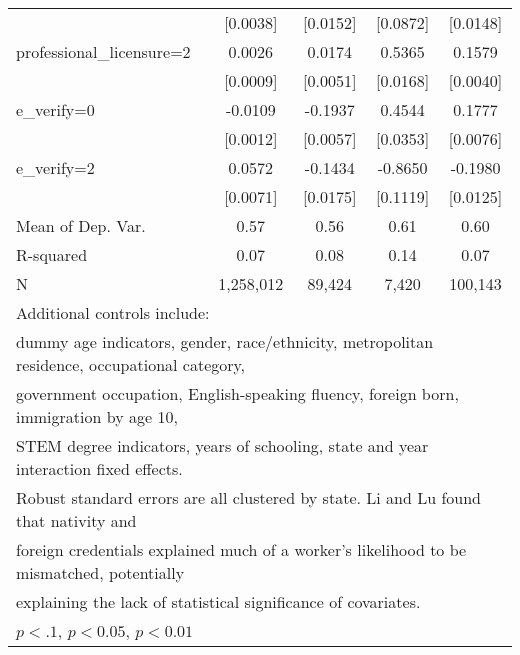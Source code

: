 \begin{table}[htbp]
\begin{tabular}{l*{4}{c}}
                    &    [0.0038]         &    [0.0152]         &    [0.0872]         &    [0.0148]         \\
\addlinespace
professional\_licensure=2&      0.0026\sym{***}&      0.0174\sym{***}&      0.5365\sym{***}&      0.1579\sym{***}\\
                    &    [0.0009]         &    [0.0051]         &    [0.0168]         &    [0.0040]         \\
\addlinespace
e\_verify=0          &     -0.0109\sym{***}&     -0.1937\sym{***}&      0.4544\sym{***}&      0.1777\sym{***}\\
                    &    [0.0012]         &    [0.0057]         &    [0.0353]         &    [0.0076]         \\
\addlinespace
e\_verify=2          &      0.0572\sym{***}&     -0.1434\sym{***}&     -0.8650\sym{***}&     -0.1980\sym{***}\\
                    &    [0.0071]         &    [0.0175]         &    [0.1119]         &    [0.0125]         \\
\midrule
Mean of Dep. Var.   &        0.57         &        0.56         &        0.61         &        0.60         \\
R-squared           &        0.07         &        0.08         &        0.14         &        0.07         \\
N                   &   1,258,012         &      89,424         &       7,420         &     100,143         \\
\bottomrule
\multicolumn{5}{l}{\footnotesize Additional controls include:}\\
\multicolumn{5}{l}{\footnotesize dummy age indicators, gender, race/ethnicity, metropolitan residence, occupational category,}\\
\multicolumn{5}{l}{\footnotesize government occupation, English-speaking fluency, foreign born, immigration by age 10,}\\
\multicolumn{5}{l}{\footnotesize STEM degree indicators, years of schooling, state and year interaction fixed effects.}\\
\multicolumn{5}{l}{\footnotesize Robust standard errors are all clustered by state. Li and Lu found that nativity and}\\
\multicolumn{5}{l}{\footnotesize foreign credentials explained much of a worker's likelihood to be mismatched, potentially}\\
\multicolumn{5}{l}{\footnotesize explaining the lack of statistical significance of covariates.}\\
\multicolumn{5}{l}{\footnotesize \sym{*} \(p<.1\), \sym{**} \(p<0.05\), \sym{***} \(p<0.01\)}\\
\end{tabular}
\end{table}
